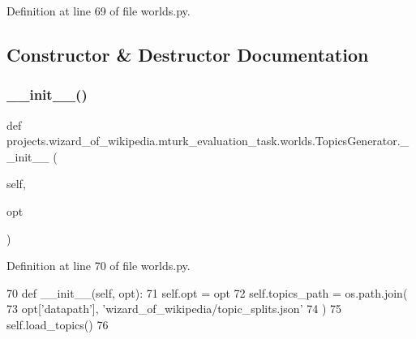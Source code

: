 Definition at line 69 of file worlds.\+py.



\subsection{Constructor \& Destructor Documentation}
\mbox{\label{classprojects_1_1wizard__of__wikipedia_1_1mturk__evaluation__task_1_1worlds_1_1TopicsGenerator_ab0591d0cf65c47ce1341247bd0c79d36}} 
\subsubsection{\texorpdfstring{\+\_\+\+\_\+init\+\_\+\+\_\+()}{\_\_init\_\_()}}
{\footnotesize\ttfamily def projects.\+wizard\+\_\+of\+\_\+wikipedia.\+mturk\+\_\+evaluation\+\_\+task.\+worlds.\+Topics\+Generator.\+\_\+\+\_\+init\+\_\+\+\_\+ (\begin{DoxyParamCaption}\item[{}]{self,  }\item[{}]{opt }\end{DoxyParamCaption})}



Definition at line 70 of file worlds.\+py.


\begin{DoxyCode}
70     \textcolor{keyword}{def }\_\_init\_\_(self, opt):
71         self.opt = opt
72         self.topics\_path = os.path.join(
73             opt[\textcolor{stringliteral}{'datapath'}], \textcolor{stringliteral}{'wizard\_of\_wikipedia/topic\_splits.json'}
74         )
75         self.load\_topics()
76 
\end{DoxyCode}


